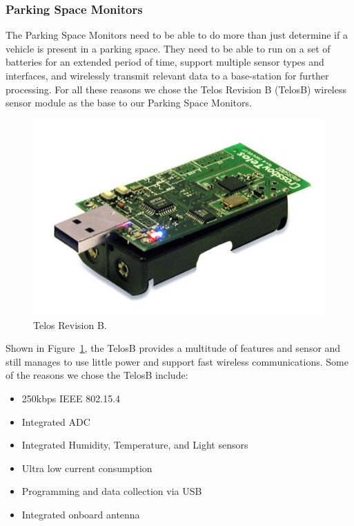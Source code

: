 \documentclass{acm_proc}
\begin{document}
\subsubsection{Parking Space Monitors}

The Parking Space Monitors need to be able to do more than just determine if a vehicle is present in a parking space.  They need to be able to run on a set of batteries for an extended period of time, support multiple sensor types and interfaces, and wirelessly transmit relevant data to a base-station for further processing.  For all these reasons we chose the Telos Revision B (TelosB) wireless sensor module as the base to our Parking Space Monitors.

\begin{figure}[h]
    \begin{center}
		\includegraphics[width=\columnwidth]{figures/telosb}
	\end{center}
	\caption{Telos Revision B.}
	\label{fig:telosb}
\end{figure}


Shown in Figure~\ref{fig:telosb}, the TelosB provides a multitude of features and sensor and still manages to use little power and support fast wireless communications.  Some of the reasons we chose the TelosB include:

\begin{itemize}
	\item 250kbps IEEE 802.15.4
	\item Integrated ADC
	\item Integrated Humidity, Temperature, and Light sensors
	\item Ultra low current consumption
	\item Programming and data collection via USB
	\item Integrated onboard antenna
\end{itemize}
\end{document}
